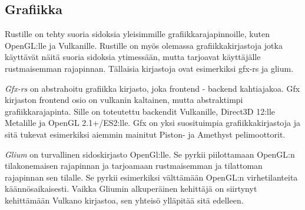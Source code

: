 \documentclass[finnish]{tktltiki2}
\theoremstyle{definition}
\theoremstyle{remark}
\begin{document}
\subsection{Grafiikka}

Rustille on tehty suoria sidoksia yleisimmille grafiikkarajapinnoille, kuten OpenGL:lle ja Vulkanille. Rustille on myös olemassa grafiikkakirjastoja jotka käyttävät näitä suoria sidoksia ytimessään, mutta tarjoavat käyttäjälle rustmaisemman rajapinnan. Tällaisia kirjastoja ovat esimerkiksi gfx-rs ja glium.

\textit{Gfx-rs} on abstrahoitu grafiikka kirjasto, joka frontend - backend kahtiajakoa. Gfx kirjaston frontend osio on vulkanin kaltainen, mutta abstraktimpi grafiikkarajapinta. Sille on toteutettu backendit Vulkanille, Direct3D 12:lle Metalille ja OpenGL 2.1+/ES2:lle. Gfx on yksi suosituimpia grafiikkakirjastoja ja sitä tukevat esimerkiksi aiemmin mainitut Piston- ja Amethyst pelimoottorit.

\textit{Glium} on turvallinen sidoskirjasto OpenGl:lle. Se pyrkii piilottamaan OpenGL:n tilakonemaisen rajapinnan ja tarjoamaan rustmaisemman ja tilattoman rajapinnan sen tilalle. Se pyrkii esimerkiksi välttämään OpenGL:n virhetilanteita käännösaikaisesti. Vaikka Gliumin alkuperäinen kehittäjä on siirtynyt kehittämään Vulkano kirjastoa, sen yhteisö ylläpitää sitä edelleen.





% 



%
%
% 
%







% 
\end{document}
